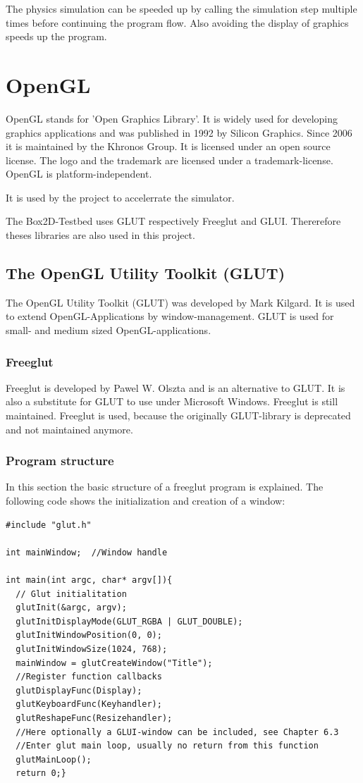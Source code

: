 \documentclass[10pt,a4paper,DIV=11]{scrreprt}
\begin{document}
The physics simulation can be speeded up by calling the simulation step multiple times before continuing the program flow. Also avoiding the display of graphics speeds up the program.


\chapter{OpenGL}
OpenGL stands for 'Open Graphics Library'\cite{ogl}. It is widely used for developing graphics applications and was published in 1992 by Silicon Graphics. Since 2006 it is maintained by the Khronos Group. It is licensed under an open source license. The logo and the trademark are licensed under a trademark-license.
OpenGL is platform-independent.


It is used by the project to accelerrate the simulator.

The Box2D-Testbed uses GLUT respectively Freeglut and GLUI. Thererefore theses libraries are also used in this project.


\section{The OpenGL Utility Toolkit (GLUT)}
The OpenGL Utility Toolkit (GLUT) was developed by Mark Kilgard\cite{glut}. It is used to extend OpenGL-Applications by window-management. GLUT is used for small- and medium sized OpenGL-applications.

\subsection{Freeglut}
Freeglut is developed by Pawel W. Olszta\cite{freeglut} and is an alternative to GLUT. It is also a substitute for GLUT to use under Microsoft Windows. Freeglut is still maintained. Freeglut is used, because the originally GLUT-library is deprecated and not maintained anymore.

\subsection{Program structure}
In this section the basic structure of a freeglut program is explained.
The following code shows the initialization and creation of a window:

\begin{lstlisting}[caption={Initialization of a GLUT program},label=lst:glut-init]
#include "glut.h"

int mainWindow;  //Window handle

int main(int argc, char* argv[]){
  // Glut initialitation
  glutInit(&argc, argv);
  glutInitDisplayMode(GLUT_RGBA | GLUT_DOUBLE);
  glutInitWindowPosition(0, 0); 
  glutInitWindowSize(1024, 768);
  mainWindow = glutCreateWindow("Title");
  //Register function callbacks
  glutDisplayFunc(Display);
  glutKeyboardFunc(Keyhandler);
  glutReshapeFunc(Resizehandler);
  //Here optionally a GLUI-window can be included, see Chapter 6.3
  //Enter glut main loop, usually no return from this function
  glutMainLoop(); 
  return 0;}
\end{lstlisting}
\end{document}
